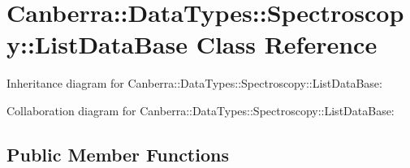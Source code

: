 \hypertarget{class_canberra_1_1_data_types_1_1_spectroscopy_1_1_list_data_base}{}\section{Canberra\+:\+:Data\+Types\+:\+:Spectroscopy\+:\+:List\+Data\+Base Class Reference}
\label{class_canberra_1_1_data_types_1_1_spectroscopy_1_1_list_data_base}


Inheritance diagram for Canberra\+:\+:Data\+Types\+:\+:Spectroscopy\+:\+:List\+Data\+Base\+:


Collaboration diagram for Canberra\+:\+:Data\+Types\+:\+:Spectroscopy\+:\+:List\+Data\+Base\+:
\subsection*{Public Member Functions}
